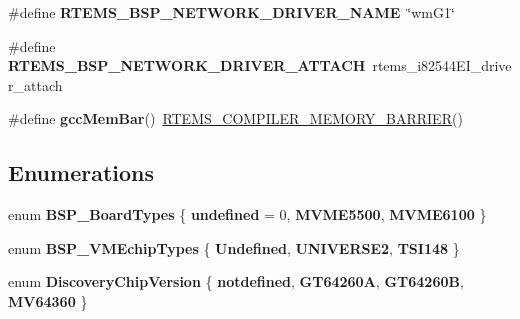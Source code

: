 \begin{DoxyCompactItemize}
\#define {\bfseries R\+T\+E\+M\+S\+\_\+\+B\+S\+P\+\_\+\+N\+E\+T\+W\+O\+R\+K\+\_\+\+D\+R\+I\+V\+E\+R\+\_\+\+N\+A\+ME}~\char`\"{}wm\+G1\char`\"{}
\item 
\mbox{\label{group__RTEMSBSPsPowerPCMVME5500_gadde0d66aef9442971dde465292ac14e6}} 
\#define {\bfseries R\+T\+E\+M\+S\+\_\+\+B\+S\+P\+\_\+\+N\+E\+T\+W\+O\+R\+K\+\_\+\+D\+R\+I\+V\+E\+R\+\_\+\+A\+T\+T\+A\+CH}~rtems\+\_\+i82544\+E\+I\+\_\+driver\+\_\+attach
\item 
\mbox{\label{group__RTEMSBSPsPowerPCMVME5500_ga81006b166419eebe8165b2014d99ebde}} 
\#define {\bfseries gcc\+Mem\+Bar}()~\mbox{\hyperlink{group__RTEMSScoreBaseDefs_ga81cf73d35183e14fe3e08dffb62ec579}{R\+T\+E\+M\+S\+\_\+\+C\+O\+M\+P\+I\+L\+E\+R\+\_\+\+M\+E\+M\+O\+R\+Y\+\_\+\+B\+A\+R\+R\+I\+ER}}()
\end{DoxyCompactItemize}
\subsection*{Enumerations}
\begin{DoxyCompactItemize}
\item 
\mbox{\label{group__RTEMSBSPsPowerPCMVME5500_gaaa92301e3304cb524c5353a335006bb4}} 
enum {\bfseries B\+S\+P\+\_\+\+Board\+Types} \{ {\bfseries undefined} = 0, 
{\bfseries M\+V\+M\+E5500}, 
{\bfseries M\+V\+M\+E6100}
 \}
\item 
\mbox{\label{group__RTEMSBSPsPowerPCMVME5500_gafdab7650a7c9934e1ff82828123043e2}} 
enum {\bfseries B\+S\+P\+\_\+\+V\+M\+Echip\+Types} \{ {\bfseries Undefined}, 
{\bfseries U\+N\+I\+V\+E\+R\+S\+E2}, 
{\bfseries T\+S\+I148}
 \}
\item 
\mbox{\label{group__RTEMSBSPsPowerPCMVME5500_ga5dffb2799eac8c4e740e383702982a5c}} 
enum {\bfseries Discovery\+Chip\+Version} \{ {\bfseries notdefined}, 
{\bfseries G\+T64260A}, 
{\bfseries G\+T64260B}, 
{\bfseries M\+V64360}
 \}
\end{DoxyCompactItemize}
